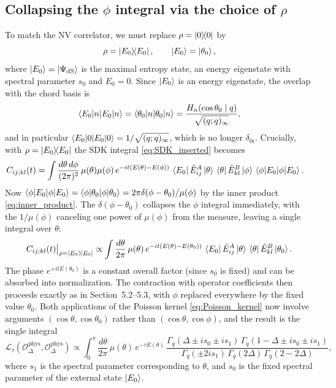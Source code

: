 \documentclass[12pt]{article}
\newcommand{\dS}{\mathrm{dS}}
\newcommand{\phys}{\mathrm{phys}}
\begin{document}
\subsection{Collapsing the $\phi$ integral via the choice of $\rho$}
To match the NV correlator, we must replace $\rho = \ketbra{0}{0}$ by
\begin{equation}
    \rho = \ketbra{E_0}{E_0}, \qquad \ket{E_0} = \ket{\theta_0},
    \label{eq:rho_E0}
\end{equation}
where $\ket{E_0} = \ket{\Psi_\dS}$ is the maximal entropy state, an energy eigenstate
with spectral parameter $s_0$ and $E_0 = 0$. Since $\ket{E_0}$ is an energy eigenstate,
the overlap with the chord basis is
\begin{equation}
    \braket{E_0|n}
    = \braket{\theta_0|n}
    = \frac{H_n(\cos\theta_0\mid q)}{\sqrt{(q;q)_\infty}},
\end{equation}
and in particular $\braket{E_0|0} = 1/\sqrt{(q;q)_\infty}$, which is no longer
$\delta_{0i}$. Crucially, with $\rho = \ketbra{E_0}{E_0}$ the SDK integral
\eqref{eq:SDK_inserted} becomes
\begin{align}
    C_{ij;kl}(t)
    &= \int\frac{d\theta\,d\phi}{(2\pi)^2}\,\mu(\theta)\mu(\phi)\,
       e^{-it(E(\theta)-E(\phi))}\,
       \bra{E_0}\hat{E}^A_{ij}\ket{\theta}\,
       \bra{\theta}\hat{E}^B_{kl}\ket{\phi}\,
       \braket{\phi|E_0}.
\end{align}
Now $\braket{\phi|E_0} = \braket{\phi|\theta_0} = 2\pi\delta(\phi-\theta_0)/\mu(\phi)$
by the inner product \eqref{eq:inner_product}. The $\delta(\phi-\theta_0)$ collapses
the $\phi$ integral immediately, with the $1/\mu(\phi)$ canceling one power of $\mu(\phi)$
from the measure, leaving a single integral over $\theta$:
\begin{equation}
    C_{ij;kl}(t)\big|_{\rho=\ketbra{E_0}{E_0}}
    \propto
    \int\frac{d\theta}{2\pi}\,\mu(\theta)\,
    e^{-it(E(\theta)-E(\theta_0))}\,
    \bra{E_0}\hat{E}^A_{ij}\ket{\theta}\,
    \bra{\theta}\hat{E}^B_{kl}\ket{\theta_0}.
\end{equation}
The phase $e^{+itE(\theta_0)}$ is a constant overall factor (since $s_0$ is fixed)
and can be absorbed into normalization. The contraction with operator coefficients
then proceeds exactly as in Section~5.2--5.3, with $\phi$ replaced everywhere by
the fixed value $\theta_0$. Both applications of the Poisson kernel \eqref{eq:Poisson_kernel}
now involve arguments $(\cos\theta, \cos\theta_0)$ rather than $(\cos\theta, \cos\phi)$,
and the result is the single integral
\begin{equation}
    \boxed{
    \mathcal{L}_\tau(\mathcal{O}^\phys_\Delta, \mathcal{O}^\phys_\Delta)
    \propto
    \int_0^\pi \frac{d\theta}{2\pi}\,\mu(\theta)\,e^{-\tau E(\theta)}\,
    \frac{\Gamma_q(\Delta\pm is_0\pm is_1)\,\Gamma_q(1-\Delta\pm is_0\pm is_1)}
         {\Gamma_q(\pm 2is_1)\,\Gamma_q(2\Delta)\,\Gamma_q(2-2\Delta)},
    }
    \label{eq:final_correlator}
\end{equation}
where $s_1$ is the spectral parameter corresponding to $\theta$, and $s_0$ is the
fixed spectral parameter of the external state $\ket{E_0}$.
\end{document}

